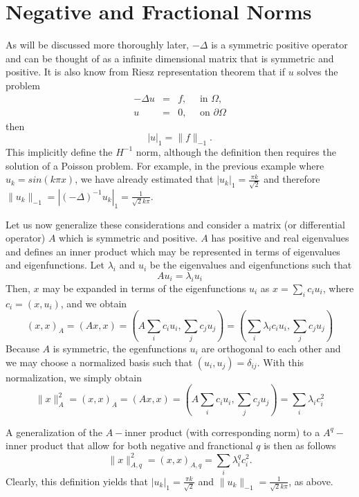 \section{Negative and Fractional Norms}

As will be discussed more thoroughly later, 
$-\Delta$ is a symmetric positive operator and can be thought of 
as a infinite dimensional matrix that is symmetric and positive.  
It is also know from Riesz representation theorem that if
$u$ solves the problem
\begin{eqnarray*}
-\Delta u &=& f, \quad \mbox{ in } \Omega, \\   
        u &=& 0, \quad \mbox{ on } \partial \Omega  
\end{eqnarray*}
then 
\begin{equation}
\label{riesz}
|u|_1 = \|f\|_{-1} . 
\end{equation}
This implicitly define the $H^{-1}$ norm, although
the definition then requires the solution of a Poisson problem.   
For example, in the previous example where
$u_k = sin(k\pi x)$, we  have already estimated  
that $|u_k|_1 = \frac{\pi k}{\sqrt{2}}$ and therefore 
$\|u_k\|_{-1} = |(-\Delta)^{-1} u_k|_1 = \frac{1}{\sqrt{2} k \pi }$.  

Let us now generalize these considerations and  consider a matrix 
(or differential operator) $A$ which is
symmetric and positive. $A$ has positive and real
eigenvalues and defines an inner product which may
be represented in terms of eigenvalues and eigenfunctions. Let     
$\lambda_i$ and $u_i$ be the eigenvalues and eigenfunctions
such that 
\[
A u_i = \lambda_i u_i  
\]
Then, $x$ may be expanded in terms of the eigenfunctions $u_i$ as
$x=\sum_i c_i u_i$, where $c_i = (x, u_i)$,  and we obtain 
\[
(x,x)_A = (A x, x) = (A \sum_i c_i u_i  , \sum_j c_j u_j)     
= (\sum_i \lambda_i  c_i u_i  , \sum_j c_j u_j)  
\]
Because $A$ is symmetric, the egenfunctions $u_i$  are orthogonal to each other
and we may choose a normalized basis such that $(u_i, u_j) =  \delta_{ij}$.
With this normalization, we simply obtain
\[
\|x\|_A^2 = (x,x)_A = (A x, x) = (A \sum_i c_i u_i  , \sum_j c_j u_j)     
= \sum_i \lambda_i  c_i^2    
\]


A generalization of the $A-$inner product (with corresponding norm) to 
a $A^q-$inner product that allow for both negative and franctional $q$  
is then as follows
\begin{equation}
\label{qnorm}
\|x\|_{A,q}^2 =  (x,x)_{A,q} =  \sum_i \lambda^q_i c_i^2.     
\end{equation}
Clearly, this definition yields 
that $|u_k|_1 = \frac{\pi k}{\sqrt{2}}$ and 
$\|u_k\|_{-1} = \frac{1}{\sqrt{2} k \pi }$, as above.  

